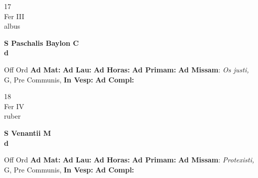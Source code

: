 \documentclass[10pt, openany]{book}
\begin{document}
        \begin{center}
            \begin{minipage}{3.5in}
                \vspace{2em}
                \begin{minipage}{0.5in}
                    {\Huge 17} \\
                    {\normalsize Fer III} \\
                    {\normalsize albus}
                \end{minipage}
                \begin{minipage}{3.0in}
                    \textbf{ \large S Paschalis Baylon C \\
                    \textnormal{\normalsize d}} \\ 
                \end{minipage}
                \begin{justify}Off Ord
                    \textbf{Ad Mat: }
                    \textbf{Ad Lau: }
                    \textbf{Ad Horas: }
                    \textbf{Ad Primam: }\textbf{Ad Missam}: \textit{Os justi,} G, Pre Communis,  
                    \textbf{In Vesp: }
                    \textbf{Ad Compl: }
                \end{justify}
            \end{minipage}
        \end{center}
    
        \begin{center}
            \begin{minipage}{3.5in}
                \vspace{2em}
                \begin{minipage}{0.5in}
                    {\Huge 18} \\
                    {\normalsize Fer IV} \\
                    {\normalsize ruber}
                \end{minipage}
                \begin{minipage}{3.0in}
                    \textbf{ \large S Venantii M \\
                    \textnormal{\normalsize d}} \\ 
                \end{minipage}
                \begin{justify}Off Ord
                    \textbf{Ad Mat: }
                    \textbf{Ad Lau: }
                    \textbf{Ad Horas: }
                    \textbf{Ad Primam: }\textbf{Ad Missam}: \textit{Protexisti,} G, Pre Communis,  
                    \textbf{In Vesp: }
                    \textbf{Ad Compl: }
                \end{justify}
            \end{minipage}
        \end{center}
    
\end{document}
